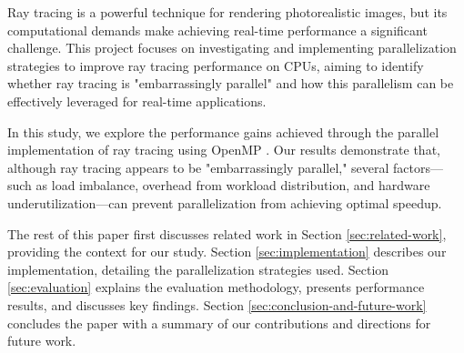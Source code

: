 




Ray tracing is a powerful technique for rendering photorealistic images, but its computational demands make achieving real-time performance a significant challenge. This project focuses on investigating and implementing parallelization strategies to improve ray tracing performance on CPUs, aiming to identify whether ray tracing is "embarrassingly parallel" and how this parallelism can be effectively leveraged for real-time applications.

In this study, we explore the performance gains achieved through the parallel implementation of ray tracing using OpenMP \cite{openmp_spec}. Our results demonstrate that, although ray tracing appears to be "embarrassingly parallel," several factors—such as load imbalance, overhead from workload distribution, and hardware underutilization—can prevent parallelization from achieving optimal speedup.

The rest of this paper first discusses related work in Section \ref{sec:related-work}, providing the context for our study. Section \ref{sec:implementation} describes our implementation, detailing the parallelization strategies used. Section \ref{sec:evaluation} explains the evaluation methodology, presents performance results, and discusses key findings. Section \ref{sec:conclusion-and-future-work} concludes the paper with a summary of our contributions and directions for future work.